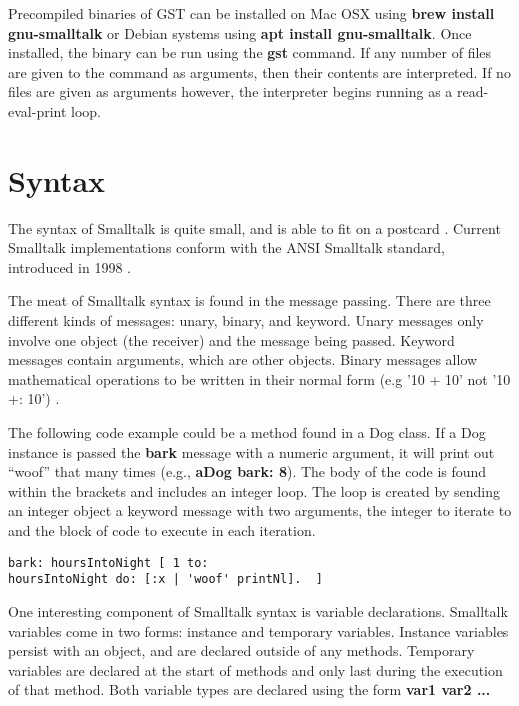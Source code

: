Precompiled binaries of GST can be installed on Mac OSX using
\textbf{brew install gnu-smalltalk} or Debian systems using
\textbf{apt install gnu-smalltalk}. Once installed, the binary can be
run using the \textbf{gst} command. If any number of files are given
to the command as arguments, then their contents are interpreted. If
no files are given as arguments however, the interpreter begins
running as a read-eval-print loop.

\section{Syntax}

The syntax of Smalltalk is quite small, and is able to fit on a
postcard \cite{postcard}. Current Smalltalk implementations conform
with the ANSI Smalltalk standard, introduced in 1998 \cite{ansi}.

The meat of Smalltalk syntax is found in the message passing. There
are three different kinds of messages: unary, binary, and
keyword. Unary messages only involve one object (the receiver) and the
message being passed. Keyword messages contain arguments, which are
other objects. Binary messages allow mathematical operations to be
written in their normal form (e.g '10 + 10' not '10 +: 10')
\cite{thebluebook}.

The following code example could be a method found in a Dog class. If
a Dog instance is passed the \textbf{bark} message with a numeric
argument, it will print out ``woof'' that many times (e.g.,
\textbf{aDog bark: 8}). The body of the code is found within the
brackets and includes an integer loop. The loop is created by sending
an integer object a keyword message with two arguments, the integer to
iterate to and the block of code to execute in each iteration.

\begin{lstlisting}[language=Simula] bark: hoursIntoNight [ 1 to:
hoursIntoNight do: [:x | 'woof' printNl].  ]
\end{lstlisting}

One interesting component of Smalltalk syntax is variable
declarations. Smalltalk variables come in two forms: instance and
temporary variables. Instance variables persist with an object, and
are declared outside of any methods. Temporary variables are declared
at the start of methods and only last during the execution of that
method. Both variable types are declared using the form \textbf{
\textbar var1 var2 ... \textbar }


